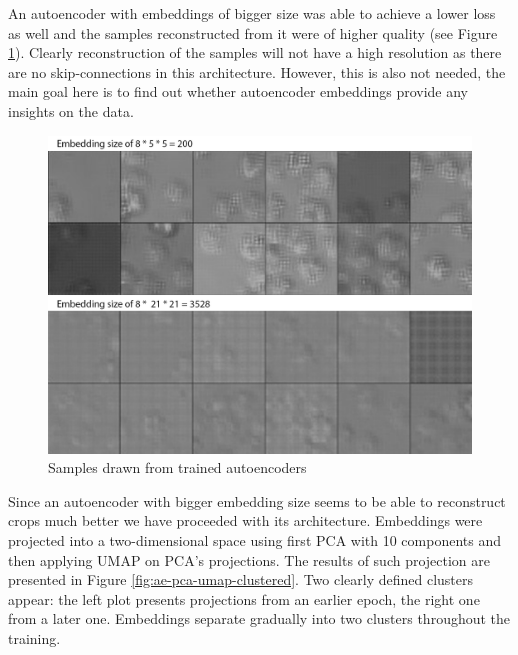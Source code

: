 An autoencoder with embeddings of bigger size was able to achieve a lower loss as well and the samples reconstructed from it were of higher quality (see Figure \ref{fig:ae-samples}). Clearly reconstruction of the samples will not have a high resolution as there are no skip-connections in this architecture. However, this is also not needed, the main goal here is to find out whether autoencoder embeddings provide any insights on the data.
\begin{figure}[H]
	\begin{center}
		\includegraphics[width=0.5\linewidth]{bilder/ae-embeddings/ae-samples.png}
		\caption{Samples drawn from trained autoencoders}
		\label{fig:ae-samples}
	\end{center}
\end{figure}

Since an autoencoder with bigger embedding size seems to be able to reconstruct crops much better we have proceeded with its architecture. Embeddings were projected into a two-dimensional space using first PCA with 10 components and then applying UMAP on PCA's projections. The results of such projection are presented in Figure \ref{fig:ae-pca-umap-clustered}. Two clearly defined clusters appear: the left plot presents projections from an earlier epoch, the right one from a later one. Embeddings separate gradually into two clusters throughout the training.

